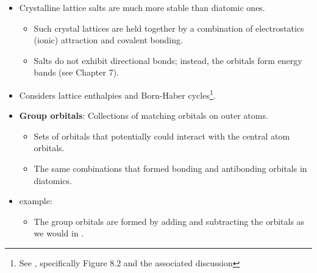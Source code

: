\documentclass[../notes.tex]{subfiles}
\begin{document}
\begin{itemize}
    \item Crystalline lattice salts are much more stable than diatomic ones.
    \begin{itemize}
        \item Such crystal lattices are held together by a combination of electrostatics (ionic) attraction and covalent bonding.
        \item Salts do not exhibit directional bonds; instead, the orbitals form energy bands (see Chapter 7).
    \end{itemize}
    \item Considers lattice enthalpies and Born-Haber cycles\footnote{See \textcite{bib:APChemNotes}, specifically Figure 8.2 and the associated discussion}.
    \item \textbf{Group orbitals}: Collections of matching orbitals on outer atoms.
    \begin{itemize}
        \item Sets of orbitals that potentially could interact with the central atom orbitals.
        \item The same combinations that formed bonding and antibonding orbitals in diatomics.
    \end{itemize}
    \item {} example:
    \begin{itemize}
        \item The group orbitals are formed by adding and subtracting the  orbitals as we would in .
        \begin{figure}[h!]
            \centering
\end{figure}
\end{itemize}
\end{itemize}
\end{document}
